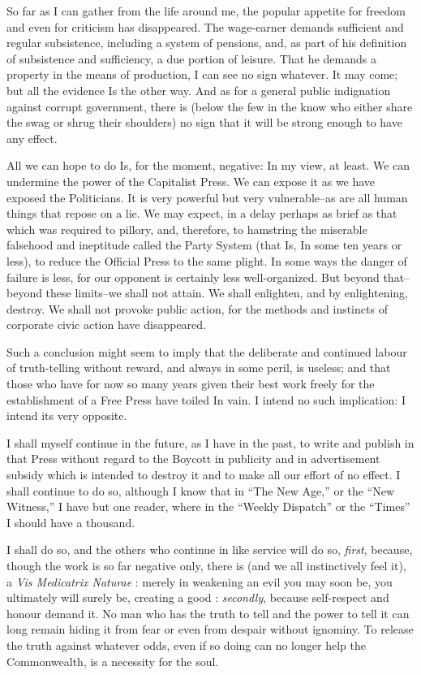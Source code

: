 \documentclass{book}
\begin{document}
So far as I can gather from the life around me, the popular appetite for freedom and even for criticism has disappeared. The wage-earner demands sufficient and regular subsistence, including a system of pensions, and, as part of his definition of subsistence and sufficiency, a due portion of leisure. That he demands a property in the means of production, I can see no sign whatever. It may come; but all the evidence Is the other way. And as for a general public indignation against corrupt government, there is (below the few in the know who either share the swag or shrug their shoulders) no sign that it will be strong enough to have any effect.

All we can hope to do Is, for the moment, negative: In my view, at least. We can undermine the power of the Capitalist Press. We can expose it as we have exposed the Politicians. It is very powerful but very vulnerable–as are all human things that repose on a lie. We may expect, in a delay perhaps as brief as that which was required to pillory, and, therefore, to hamstring the miserable falsehood and ineptitude called the Party System (that Is, In some ten years or less), to reduce the Official Press to the same plight. In some ways the danger of failure is less, for our opponent is certainly less well-organized. But beyond that–beyond these limits–we shall not attain. We shall enlighten, and by enlightening, destroy. We shall not provoke public action, for the methods and instincts of corporate civic action have disappeared.

Such a conclusion might seem to imply that the deliberate and continued labour of truth-telling without reward, and always in some peril, is useless; and that those who have for now so many years given their best work freely for the establishment of a Free Press have toiled In vain. I intend no such implication: I intend its very opposite.

I shall myself continue in the future, as I have in the past, to write and publish in that Press without regard to the Boycott in publicity and in advertisement subsidy which is intended to destroy it and to make all our effort of no effect. I shall continue to do so, although I know that in “The New Age,” or the “New Witness,” I have but one reader, where in the “Weekly Dispatch” or the “Times” I should have a thousand.

I shall do so, and the others who continue in like service will do so, \emph{first}, because, though the work is so far negative only, there is (and we all instinctively feel it), a \emph{Vis Medicatrix Naturae} : merely in weakening an evil you may soon be, you ultimately will surely be, creating a good : \emph{secondly}, because self-respect and honour demand it. No man who has the truth to tell and the power to tell it can long remain hiding it from fear or even from despair without ignominy. To release the truth against whatever odds, even if so doing can no longer help the Commonwealth, is a necessity for the soul.
\end{document}
